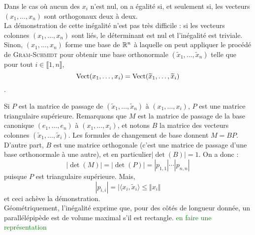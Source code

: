 Dans le cas où aucun des $x_i$ n'est nul, on a égalité si, et seulement si, les vecteurs $(x_1, \dots  ,x_n)$ sont orthogonaux deux à deux. \\
La démonstration de cette inégalité n'est pas très difficile : si les vecteurs colonnes $(x_1, \dots  ,x_n)$ sont liés, le déterminant est nul et l'inégalité est triviale. Sinon, $(x_1, \dots  ,x_n)$ forme une base de $\mathbb{R}^n$ à laquelle on peut appliquer le procédé de \textsc{Gram}-\textsc{Schmidt} pour obtenir une base orthonormale $(\widetilde{x}_1, \dots, \widetilde{x}_n)$ telle que pour tout $i \in \llbracket 1, n \rrbracket$, 
$$\mathrm{Vect}(x_1, \dots  ,x_i) = \mathrm{Vect}(\widetilde{x}_1, \dots, \widetilde{x}_i)$$.

Si $P$ est la matrice de passage de $(\widetilde{x}_1, \dots, \widetilde{x}_n)$ à $(x_1, \dots  ,x_i)$, $P$ est une matrice triangulaire supérieure. Remarquons que $M$ est la matrice de passage de la base canonique $(e_1, \dots, e_n)$ à $(x_1, \dots  ,x_i)$, et notons $B$ la matrice des vecteurs colonnes $(\widetilde{x}_1, \dots, \widetilde{x}_i)$. Les formules de changement de base donnent $M=BP$. D'autre part, $B$ est une matrice orthogonale (c'est une matrice de passage d'une base orthonormale à une autre), et en particulier$|\det(B)|=1$. On a donc : 
$$| \det(M) | = | \det(P) | = |p_{1,1} | \cdots |p_{n,n}|$$
puisque $P$ est triangulaire supérieure. Mais, 
$$|p_{i,i}| = |\langle x_i, \widetilde{x}_i \rangle \leqslant \Vert x_i \Vert$$
et ceci achève la démonstration. \\
Géométriquement, l'inégalité exprime que, pour des côtés de longueur donnée, un parallélépipède est de volume maximal s'il est rectangle. \textcolor{green}{en faire une représentation}